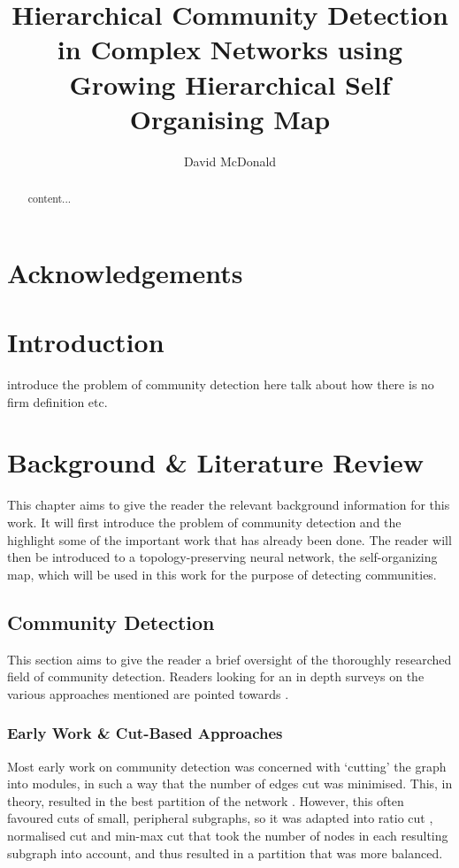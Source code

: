\documentclass{report}
\title{\Huge \textbf{Hierarchical Community Detection in Complex Networks using Growing Hierarchical Self Organising Map}}
\author{David McDonald}
\date{}
\begin{document}
\maketitle

\begin{abstract}
	content...
\end{abstract}

\chapter*{Acknowledgements}

\tableofcontents

\chapter{Introduction}

introduce the problem of community detection here
talk about how there is no firm definition etc.

\chapter{Background \& Literature Review}
This chapter aims to give the reader the relevant background information for this work. It will first introduce the problem of community detection and the highlight some of the important work that has already been done. The reader will then be introduced to a topology-preserving neural network, the self-organizing map, which will be used in this work for the purpose of detecting communities. 

\section{Community Detection}
This section aims to give the reader a brief oversight of the thoroughly researched field of community detection. Readers looking for an in depth surveys on the various approaches mentioned are pointed towards \cite{fortunato2016community,cai2016survey,zhang2016community,xie2013overlapping}.

\subsection{Early Work \& Cut-Based Approaches}
Most early work on community detection was concerned with `cutting' the graph into modules, in such a way that the number of edges cut was minimised. This, in theory, resulted in the best partition of the network \cite{kernighan1970efficient,fiduccia1982linear,ding2001min}. However, this often favoured cuts of small, peripheral subgraphs, so it was adapted into ratio cut \cite{wei1991ratio}, normalised cut \cite{shi2000normalized} and min-max cut \cite{ding2001min} that took the number of nodes in each resulting subgraph into account, and thus resulted in a partition that was more balanced.
\end{document}
